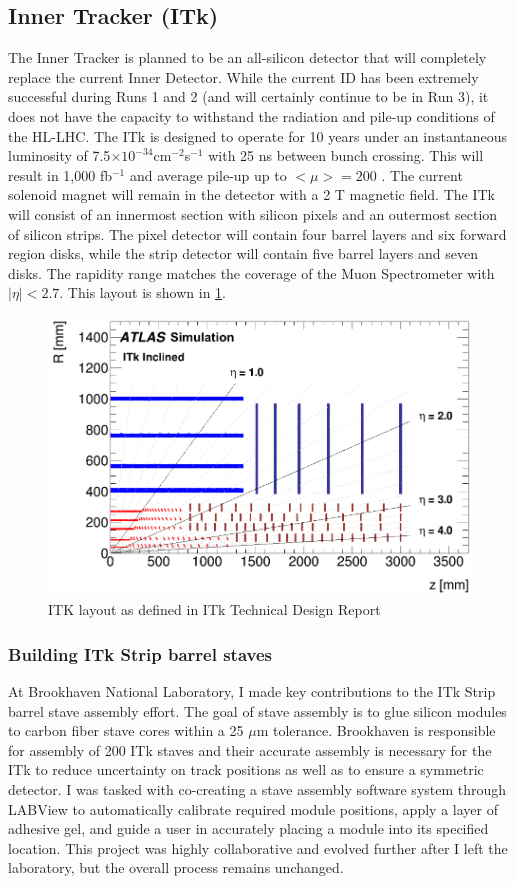 \subsection{Inner Tracker (ITk)}
The Inner Tracker is planned to be an all-silicon detector that will completely replace the current Inner Detector.  While the current ID has been extremely successful during Runs 1 and 2 (and will certainly continue to be in Run 3), it does not have the capacity to withstand the radiation and pile-up conditions of the HL-LHC. The ITk is designed to operate for 10 years under an instantaneous luminosity of 7.5$\times10^{-34}$cm$^{-2}$s$^{-1}$ with 25 ns between bunch crossing. This will result in 1,000 fb$^{-1}$ and average pile-up up to $<\mu>=200$ \cite{ITktech}. The current solenoid magnet will remain in the detector with a 2 T magnetic field. The ITk will consist of an innermost section with silicon pixels and an outermost section of silicon strips. The pixel detector will contain four barrel layers and six forward region disks, while the strip detector will contain five barrel layers and seven disks. The rapidity range matches the coverage of the Muon Spectrometer with $|\eta|<2.7$. This layout is shown in \ref{fig:ITklayout}. 
\begin{figure}[!h]
        \centering
    \includegraphics[width=.6\textwidth]{Pictures/ITklayout.png}
    \caption{ ITK layout as defined in ITk Technical Design Report \cite{ITktech}}
    \label{fig:ITklayout}
\end{figure}

\subsubsection{Building ITk Strip barrel staves}
At Brookhaven National Laboratory, I made key contributions to the ITk Strip barrel stave assembly effort. The goal of stave assembly is to glue silicon modules to carbon fiber stave cores within a 25 $\mu$m tolerance. Brookhaven is responsible for assembly of 200 ITk staves and their accurate assembly is necessary for the ITk to reduce uncertainty on track positions as well as to ensure a symmetric detector. I was tasked with co-creating a stave assembly software system through LABView to automatically calibrate required module positions, apply a layer of adhesive gel, and guide a user in accurately placing a module into its specified location. This project was highly collaborative and evolved further after I left the laboratory, but the overall process remains unchanged.

